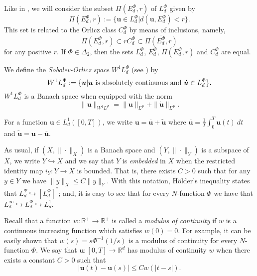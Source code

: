 \documentclass[twoside]{article}
\theoremstyle{remark}
\newcommand{\orlnor}{\|_{L^{\Phi}}}
\newcommand{\lphi}{L^{\Phi}}
\newcommand{\lpsi}{L^{\Psi}}
\newcommand{\ephi}{E^{\Phi}}
\newcommand{\claseor}{C^{\Phi}}
\newcommand{\wphi}{W^{1}\lphi}
\renewcommand{\b}[1]{\boldsymbol{#1}}
\newcommand{\rr}{\mathbb{R}}
\renewcommand{\leq}{\leqslant}
\begin{document}
Like in \cite{KR}, we will consider the subset $\Pi(\ephi_d,r)$ of $\lphi_d$ given by
\[\Pi(\ephi_d,r):=\{\b{u}\in\lphi_d| d(\b{u},\ephi_d)<r\}.\]
This set is related to the Orlicz class $\claseor_d$ by means of inclusions, namely,
\begin{equation}\label{inclusiones}\Pi(\ephi_d, r )\subset r \claseor_d\subset\overline{\Pi(\ephi_d,r)}
\end{equation}
for any positive $r$.
If $\Phi \in \Delta_2$,  then the sets $\lphi_d$, $\ephi_d$, $\Pi(\ephi_d,r)$ and $\claseor_d$ are equal.



We define the \emph{Sobolev-Orlicz space} $\wphi_d$ (see \cite{adams_sobolev}) by
\[\wphi_d:=\{\b{u}| \b{u} \hbox{ is absolutely continuous and } \b{\dot{u}}\in \lphi_d\}.\]
$\wphi_d$ is a Banach space when equipped with the norm
\begin{equation}\label{def-norma-orlicz-sob}
\|  \b{u}  \|_{\wphi}= \|  \b{u}  \|_{\lphi} + \|\b{\dot{u}}\orlnor.
\end{equation}



For a  function $\b{u}\in L^1_d([0,T])$, we write $\b{u}=\overline{\b{u}}+\widetilde{\b{u}}$ where $\overline{\b{u}} =\frac1T\int_0^T \b{u}(t)\ dt$ and $\widetilde{\b{u}}=\b{u}-\overline{\b{u}}$.

As usual, if $(X,\|\cdot\|_X)$ is a Banach space and $(Y,\|\cdot \|_Y)$ is a subspace of $X$,  we write $Y\hookrightarrow X$ and we say that $Y$ is \emph{embedded} in $X$  when the restricted identity map $i_Y:Y\to X$ is bounded. That is, there exists $C>0$ such that  for any $y\in Y$ we have $\|y\|_X\leq C\|y\|_Y$.  With this notation, H\"older's inequality states that  $\lpsi_d\hookrightarrow  \left[\lphi_d\right]^*$; and, it is easy to see that for every $N$-function $\Phi$ we have that $L^{\infty}_d\hookrightarrow\lphi_d \hookrightarrow L^1_d$.


 Recall that a function   $w:\mathbb{R}^+\to \mathbb{R}^+$ is called  a \emph{modulus of continuity} if $w$ is a continuous increasing function which satisfies $w(0)=0$. For example, it can be easily shown that $w(s)=s\Phi^{-1}(1/s)$ is a modulus of  continuity for every $N$-function $\Phi$.  We say that $\b{u}:[0,T]\to\rr^d$  has modulus of continuity $w$  when there exists a constant $C>0$ such that 
\begin{equation}\label{w-holder}|\b{u}(t)-\b{u}(s)|\leq Cw(|t-s|).
\end{equation}
\end{document}
